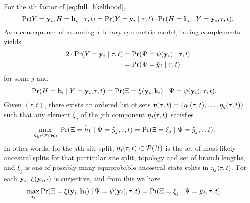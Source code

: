 For the $i$th factor of \eqref{eq:full_likelihood},
$$
\Pr(Y=\mathbf{y}_i, H=\mathbf{h}_i \mid \tau, t) = \Pr(Y=\mathbf{y}_i \mid \tau, t) \cdot \Pr(H=\mathbf{h}_i \mid Y=\mathbf{y}_i, \tau, t).
$$
As a consequence of assuming a binary symmetric model, taking complements yields
\begin{align*}
    2\cdot \Pr(Y=\mathbf{y}_i \mid \tau, t) &= \Pr(\Psi=\psi(\mathbf{y}_i) \mid \tau, t) \\
                                                                 &= \Pr(\Psi=\tilde{y}_j \mid \tau, t)
\end{align*}
for some $j$ and
\begin{align*}
    \Pr(H=\mathbf{h}_i \mid Y=\mathbf{y}_i, \tau, t) &= \Pr(\Xi=\xi(\mathbf{y}_i, \mathbf{h}_i) \mid \Psi=\psi(\mathbf{y}_i), \tau, t).
\end{align*}
Given $(\tau, t)$, there exists an ordered list of sets $\boldsymbol\eta(\tau, t)=(\eta_1(\tau, t),\ldots,\eta_q(\tau, t))$ such that any element $\xi_j$ of the $j$th component $\eta_j(\tau, t)$ satisfies
\begin{align*}
\max_{\ancestralSplit_k\in\mathcal{P}(\ancestralSplitSet)} \ \Pr(\ancestralSplitRV=\ancestralSplit_k \mid \siteSplitRV=\siteSplit_j, \tau, t) &= \Pr(\ancestralSplitRV = \xi_j \mid \siteSplitRV=\siteSplit_j, \tau, t).
\end{align*}
In other words, for the $j$th site split, $\eta_j(\tau, t)\subset\mathcal{P}(\mathcal{H})$ is the set of most likely ancestral splits for that particular site split, topology and set of branch lengths, and $\xi_j$ is one of possibly many equiprobable ancestral state splits in $\eta_j(\tau, t)$.
For each $\mathbf{y}_i$, $\xi(\mathbf{y}_i, \cdot)$ is surjective, and from this we have
\begin{align*}
\max_{\mathbf{h}_i} \Pr(\Xi=\xi(\mathbf{y}_i, \mathbf{h}_i) \mid \Psi=\psi(\mathbf{y}_i), \tau, t) &= \Pr(\Xi = \xi_j \mid \Psi=\tilde{y}_j, \tau, t).
\end{align*}

